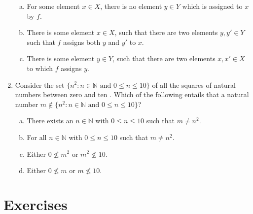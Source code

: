 \begin{enumerate}[\thesection.1]
\begin{enumerate}[(a)]
		\item For some element $x\in X$, there is no element $y\in Y$ which is assigned to $x$ by $f$.
		
		\item There is some element $x\in X$, such that there are two elements $y,y'\in Y$ such that $f$ assigns both $y$ and $y'$ to $x$.
		
		\item There is some element $y\in Y$, such that there are two elements $x,x'\in X$ to which $f$ assigns $y$.
	
	\end{enumerate}
	
	\item Consider the set $\{n^2:n\in\mathbb{N}\text{ and }0\leq n\leq 10\}$ of all the squares of natural numbers between zero and ten . Which of the following entails that a natural number $m\notin\{n^2:n\in\mathbb{N}\text{ and }0\leq n\leq 10\}$?
	
	\begin{enumerate}[(a)]
	
		\item There exists an $n\in\mathbb{N}$ with $0\leq n\leq 10$ such that $m\neq n^2$.
		
		\item For all $n\in\mathbb{N}$ with $0\leq n\leq 10$ such that $m\neq n^2$.
		
		\item Either $0\nleq m^2$ or $m^2\nleq 10$.
		
		\item Either $0\nleq m$ or $m\nleq 10$. 
		

	
	\end{enumerate}

	\end{enumerate}


\section{Exercises}
	
